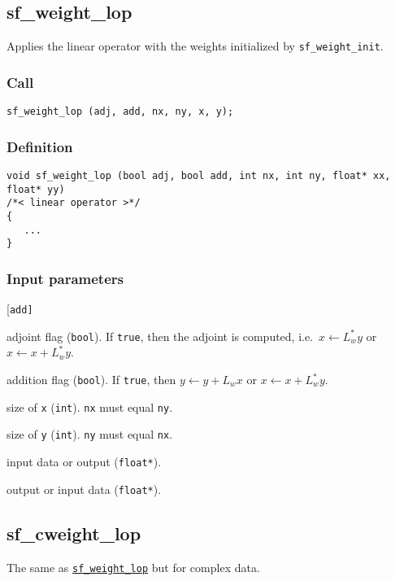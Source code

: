 \subsection{{sf\_weight\_lop}}\label{sec:sf_weight_lop}
Applies the linear operator with the weights initialized by \texttt{sf\_weight\_init}.

\subsubsection*{Call}
\begin{verbatim}sf_weight_lop (adj, add, nx, ny, x, y);\end{verbatim}

\subsubsection*{Definition}
\begin{verbatim}
void sf_weight_lop (bool adj, bool add, int nx, int ny, float* xx, float* yy)
/*< linear operator >*/
{
   ...
}
\end{verbatim}

\subsubsection*{Input parameters}
\begin{desclist}{\tt }{\quad}[\tt add]
   \setlength\itemsep{0pt}
   \item[adj] adjoint flag (\texttt{bool}). If \texttt{true}, then the adjoint is computed, i.e.~$x\leftarrow L_w^*y$ or $x\leftarrow x+L_w^*y$. 
   \item[add] addition flag (\texttt{bool}). If \texttt{true}, then $y\leftarrow y+L_wx$ or $x\leftarrow x+L_w^*y$.  
   \item[nx]  size of \texttt{x} (\texttt{int}). \texttt{nx} must equal \texttt{ny}. 
   \item[ny]  size of \texttt{y} (\texttt{int}). \texttt{ny} must equal \texttt{nx}. 
   \item[x]   input data or output (\texttt{float*}).
   \item[y]   output or input data (\texttt{float*}).
\end{desclist}




\subsection{{sf\_cweight\_lop}}
The same as \hyperref[sec:sf_weight_lop]{\texttt{sf\_weight\_lop}} but for complex data.

